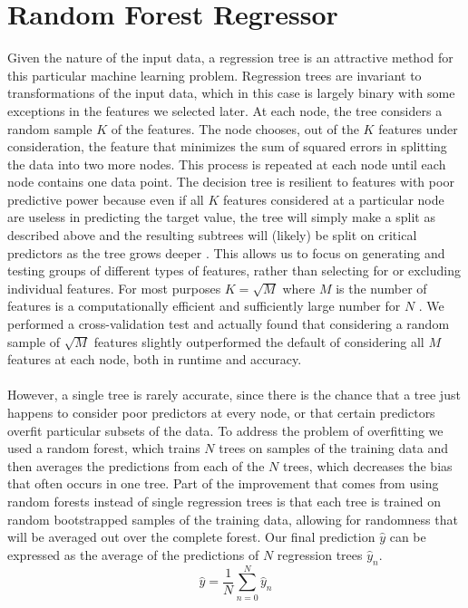 \documentclass[11pt]{article}
\begin{document}
\section*{Random Forest Regressor}
Given the nature of the input data, a regression tree is an  attractive method for this particular machine learning problem. Regression trees are invariant to transformations of the input data, which in this case is largely binary with some exceptions in the features we selected later. At each node, the tree considers a random sample $K$ of the features. The node chooses, out of the $K$ features under consideration, the feature that minimizes the sum of squared errors in splitting the data into two more nodes. This process is repeated at each node until each node contains one data point. The decision tree is resilient to features with poor predictive power because even if all $K$ features considered at a particular node are useless in predicting the target value, the tree will simply make a split as described above and the resulting subtrees will (likely) be split on critical predictors as the tree grows deeper \cite{steinberg}. 
This allows us to focus on generating and testing groups of different types of features, rather than selecting for or excluding individual features. For most purposes $K=\sqrt{M}$ where $M$ is the number of features is a computationally efficient and sufficiently large number for $N$ \cite{steinberg}. We performed a cross-validation test and actually found that considering a random sample of $\sqrt{M}$ features slightly outperformed the default of considering all $M$ features at each node, both in runtime and accuracy.  \\ \\
However, a single tree is rarely accurate, since there is the chance that a tree just happens to consider poor predictors at every node, or that certain predictors overfit particular subsets of the data. To address the problem of overfitting we used a random forest, which trains $N$ trees on samples of the training data and then averages the predictions from each of the $N$ trees, which decreases the bias that often occurs in one tree. Part of the improvement that comes from using random forests instead of single regression trees is that each tree is trained on random bootstrapped samples of the training data, allowing for randomness that will be averaged out over the complete forest. Our final prediction $\hat{y}$ can be expressed as the average of the predictions of $N$ regression trees $\hat{y}_n$.
\begin{equation*}
\hat{y} = \frac{1}{N} \sum_{n=0}^{N}\hat{y}_n
\end{equation*}
\end{document}
